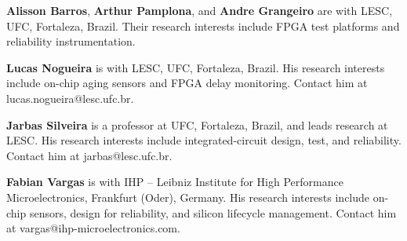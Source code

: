 \documentclass[10pt,twocolumn]{article}
\begin{document}
\smallskip\noindent\textbf{Alisson Barros}, \textbf{Arthur Pamplona}, and \textbf{Andre Grangeiro} are with LESC, UFC, Fortaleza, Brazil. Their research interests include FPGA test platforms and reliability instrumentation.

\smallskip\noindent\textbf{Lucas Nogueira} is with LESC, UFC, Fortaleza, Brazil. His research interests include on-chip aging sensors and FPGA delay monitoring. Contact him at lucas.nogueira@lesc.ufc.br.

\smallskip\noindent\textbf{Jarbas Silveira} is a professor at UFC, Fortaleza, Brazil, and leads research at LESC. His research interests include integrated-circuit design, test, and reliability. Contact him at jarbas@lesc.ufc.br.

\smallskip\noindent\textbf{Fabian Vargas} is with IHP -- Leibniz Institute for High Performance Microelectronics, Frankfurt (Oder), Germany. His research interests include on-chip sensors, design for reliability, and silicon lifecycle management. Contact him at vargas@ihp-microelectronics.com.
\end{document}
